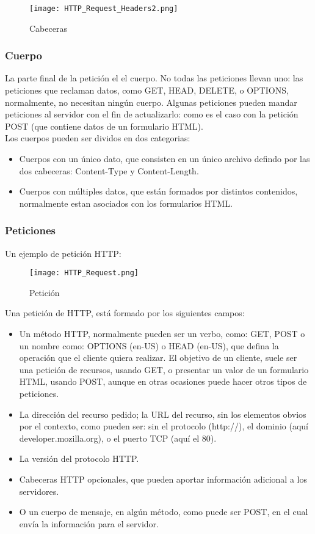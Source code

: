 \begin{figure}[H]
	\center
	\texttt{[image: HTTP\_Request\_Headers2.png]}
	\caption{Cabeceras}
	\label{fig:super}
\end{figure}

\subsubsection{Cuerpo}
La parte final de la petición el el cuerpo. No todas las peticiones llevan uno: las peticiones que reclaman datos, como GET, HEAD, DELETE, o OPTIONS, normalmente, no necesitan ningún cuerpo. Algunas peticiones pueden mandar peticiones al servidor con el fin de actualizarlo: como es el caso con la petición POST  (que contiene datos de un formulario HTML). 
\\
Los cuerpos pueden ser dividos en dos categorias:
\begin{itemize}
	\item Cuerpos con un único dato, que consisten en un único archivo defindo por las dos cabeceras: Content-Type y Content-Length.  
	\item Cuerpos con múltiples datos, que están formados por distintos contenidos, normalmente estan asociados con los formularios HTML. 
\end{itemize}

\subsubsection{Peticiones}
Un ejemplo de petición HTTP:

\begin{figure}[H]
	\center
	\texttt{[image: HTTP\_Request.png]}
	\caption{Petición}
	\label{fig:super}
\end{figure}
Una petición de HTTP, está formado  por los siguientes campos:

\begin{itemize}
	\item Un método HTTP,  normalmente pueden ser un verbo, como: GET, POST o un nombre como: OPTIONS (en-US) o HEAD (en-US), que defina la operación que el cliente quiera realizar. El objetivo de un cliente, suele ser una petición de recursos, usando GET, o presentar un valor de un formulario HTML, usando POST, aunque en otras ocasiones puede hacer otros tipos de peticiones. 
	\item La dirección del recurso pedido; la URL del recurso, sin los elementos obvios por el contexto, como pueden ser: sin el  protocolo (http://),  el dominio (aquí developer.mozilla.org), o el puerto TCP (aquí el 80). 
	\item La versión del protocolo HTTP.
	\item Cabeceras HTTP opcionales, que pueden aportar información adicional a los servidores.
	\item O un cuerpo de mensaje, en algún método, como puede ser POST, en el cual envía la información para el servidor.
\end{itemize}

